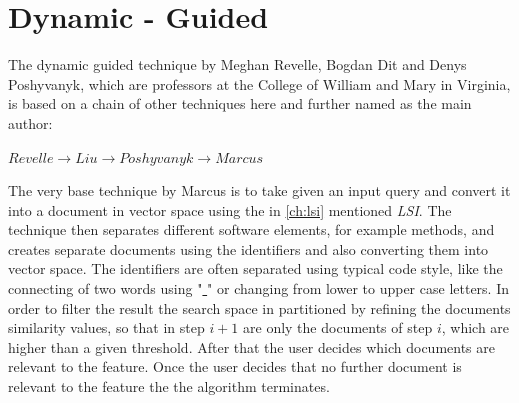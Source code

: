 \section{Dynamic - Guided}
The dynamic guided technique by Meghan Revelle, Bogdan Dit and Denys Poshyvanyk, which are professors at the College of William and Mary in Virginia, is based on a chain of other techniques here and further named as the main author:
\begin{center}
	$Revelle \rightarrow Liu \rightarrow Poshyvanyk \rightarrow Marcus$
\end{center}
\label{ref:marcus}
The very base technique by Marcus is to take given an input query and convert it into a document in vector space using the in \autoref{ch:lsi} mentioned \textit{LSI}. The technique then separates different software elements, for example methods, and creates separate documents using the identifiers and also converting them into vector space. The identifiers are often separated using typical code style, like the connecting of two words using "\underline{ }" or changing from lower to upper case letters. In order to filter the result the search space in partitioned by refining the documents similarity values, so that in step $i+1$ are only the documents of step $i$, which are higher than a given threshold. After that the user decides which documents are relevant to the feature. Once the user decides that no further document is relevant to the feature the the algorithm terminates. \cite{marcus2004semantic} \newline
